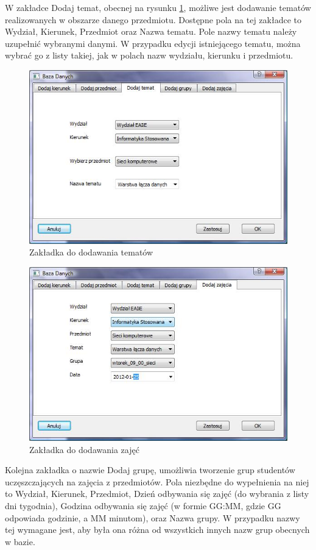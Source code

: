 W zakładce Dodaj temat, obecnej na rysunku \ref{fig:dodajTemat}, możliwe jest dodawanie tematów realizowanych w obszarze danego przedmiotu. Dostępne pola na tej zakładce to Wydział, Kierunek, Przedmiot oraz Nazwa tematu. Pole nazwy tematu należy uzupełnić wybranymi danymi. W przypadku edycji istniejącego tematu, można wybrać go z listy takiej, jak w polach nazw wydziału, kierunku i przedmiotu.

\begin{figure}
\begin{center}
\includegraphics[scale=0.7]{dodaj_temat.jpg}
\caption{Zakładka do dodawania tematów}
\label{fig:dodajTemat}
\end{center}
\end{figure}

\begin{figure}
\begin{center}
\includegraphics[scale=0.7]{dodaj_zajecia.jpg}
\caption{Zakładka do dodawania zajęć}
\label{fig:dodajZajecia}
\end{center}
\end{figure}
Kolejna zakładka o nazwie Dodaj grupę, umożliwia tworzenie grup studentów uczęszczających na zajęcia z przedmiotów. Pola niezbędne do wypełnienia na niej to Wydział, Kierunek, Przedmiot, Dzień odbywania się zajęć (do wybrania z listy dni tygodnia), Godzina odbywania się zajęć (w formie GG:MM, gdzie GG odpowiada godzinie, a MM minutom), oraz Nazwa grupy. W przypadku nazwy tej wymagane jest, aby była ona różna od wszystkich innych nazw grup obecnych w bazie.

